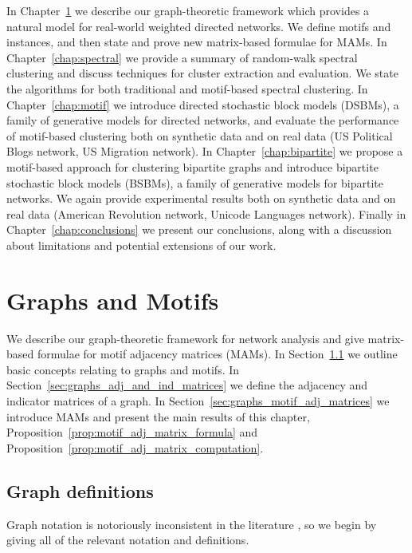 \documentclass[12pt,draft]{ociamthesis}
\theoremstyle{plain}
\theoremstyle{definition}
\theoremstyle{remark}
\begin{document}
In Chapter~\ref{chap:graphs} we describe our graph-theoretic framework which
provides a natural model for real-world weighted directed networks.
We define motifs and instances, and then state and prove new matrix-based
formulae for MAMs.
%
In Chapter~\ref{chap:spectral} we provide a summary of random-walk spectral
clustering and discuss techniques for cluster extraction and evaluation.
We state the algorithms for both traditional and motif-based spectral
clustering.
%
In Chapter~\ref{chap:motif} we introduce directed stochastic block models
(DSBMs), a family of generative models for directed networks, and evaluate the
performance of motif-based clustering both on synthetic data and on real data
(US Political Blogs network, US Migration network).
%
In Chapter~\ref{chap:bipartite} we propose a motif-based approach for
clustering bipartite graphs and introduce bipartite stochastic block models
(BSBMs), a family of generative models for bipartite networks. We again provide
experimental results both on synthetic data and on real data (American
Revolution network, Unicode Languages network).
%
Finally in Chapter~\ref{chap:conclusions} we present our conclusions, along
with a discussion about limitations and potential extensions of our work.

\clearpage{}
\clearpage{}
\chapter{Graphs and Motifs} \label{chap:graphs}

We describe our graph-theoretic framework for network analysis and give
matrix-based formulae for motif adjacency matrices (MAMs).
In Section~\ref{sec:graphs_graph_definitions} we outline basic concepts
relating to graphs and motifs.
In Section~\ref{sec:graphs_adj_and_ind_matrices} we define the adjacency and
indicator matrices of a graph.
In Section~\ref{sec:graphs_motif_adj_matrices} we introduce MAMs and present
the main results of this chapter,
Proposition~\ref{prop:motif_adj_matrix_formula} and
Proposition~\ref{prop:motif_adj_matrix_computation}.

\section{Graph definitions} \label{sec:graphs_graph_definitions}

Graph notation is notoriously inconsistent in the literature
\cite{intro_to_graph_theory}, so we begin by giving all of the relevant
notation and definitions.
\end{document}
